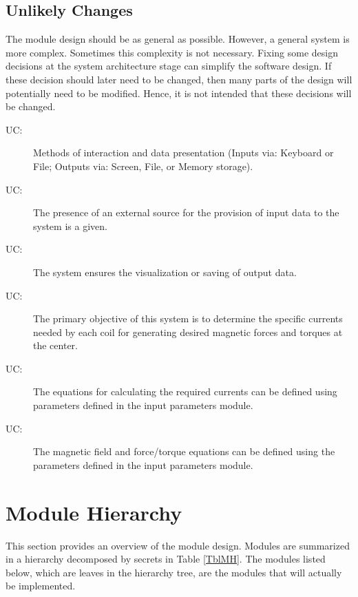 \documentclass[12pt, titlepage]{article}
\newcounter{ucnum}
\newcommand{\uctheucnum}{UC\theucnum}
\begin{document}
\subsection{Unlikely Changes} \label{SecUchange}

The module design should be as general as possible. However, a general system is
more complex. Sometimes this complexity is not necessary. Fixing some design
decisions at the system architecture stage can simplify the software design. If
these decision should later need to be changed, then many parts of the design
will potentially need to be modified. Hence, it is not intended that these
decisions will be changed.

\begin{description}
\item[ \uctheucnum \label{ucInteractionMethods}:] Methods of interaction and data presentation (Inputs via: Keyboard or File; Outputs via: Screen, File, or Memory storage).
\item[ \uctheucnum \label{ucDataAvailability}:] The presence of an external source for the provision of input data to the system is a given.
\item[ \uctheucnum \label{ucDataPresentation}:] The system ensures the visualization or saving of output data.
\item[ \uctheucnum \label{ucObjective}:] The primary objective of this system is to determine the specific currents needed by each coil for generating desired magnetic forces and torques at the center.
\item[ \uctheucnum \label{ucCurrentCalculationODE}:] The equations for calculating the required currents can be defined using parameters defined in the input parameters module.
\item[ \uctheucnum \label{ucMagneticFieldEquations}:] The magnetic field and force/torque equations can be defined using the parameters defined in the input parameters module.
\end{description}


\section{Module Hierarchy} \label{SecMH}

This section provides an overview of the module design. Modules are summarized
in a hierarchy decomposed by secrets in Table \ref{TblMH}. The modules listed
below, which are leaves in the hierarchy tree, are the modules that will
actually be implemented.
\end{document}
